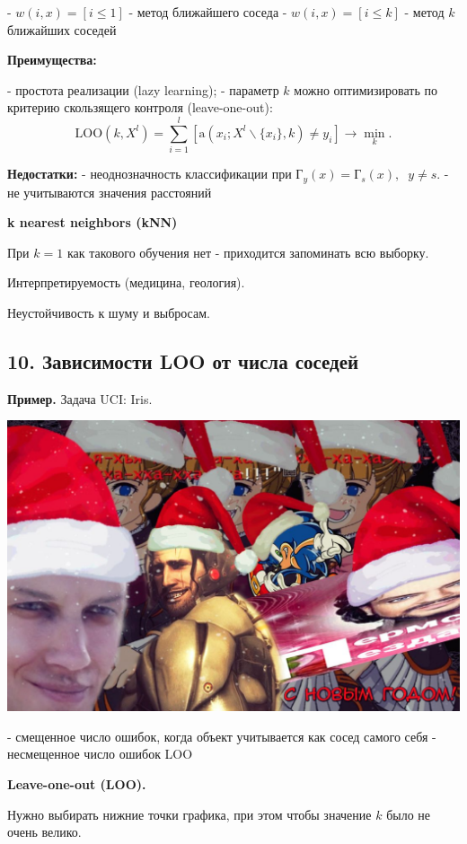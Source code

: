 - $w(i,x) = [i \leqslant 1]$ - метод ближайшего соседа
- $w(i,x) = [i \leqslant k]$ - метод $k$ ближайших соседей

\textbf{Преимущества:}

- простота реализации (lazy learning);
- параметр $k$ можно оптимизировать по критерию скользящего контроля
(leave-one-out):
$$\text{LOO}{(k, X^l)} = \sum^l_{i=1}{\left[ \text{a}
{\left(x_i; X^l \backslash \lbrace x_i \rbrace, k \right)}
\neq y_i \right]} \rightarrow \min_k.$$

\textbf{Недостатки:}
- неоднозначность классификации при $Г_y(x) = Г_s(x), \;\; y \neq s$.
- не учитываются значения расстояний

\textbf{k nearest neighbors (kNN)}

При $k=1$ как такового обучения нет - приходится запоминать всю выборку.

Интерпретируемость (медицина, геология).

Неустойчивость к шуму и выбросам.

\subsection{10. Зависимости LOO от числа соседей}

\textbf{Пример.} Задача UCI: Iris.

\includegraphics[scale=0.3]{figures/samplefigure.jpg}

- смещенное число ошибок, когда объект
учитывается как сосед самого себя
- несмещенное число ошибок LOO

\textbf{Leave-one-out (LOO).}

Нужно выбирать нижние точки графика, при этом чтобы значение $k$ было не
очень велико.

